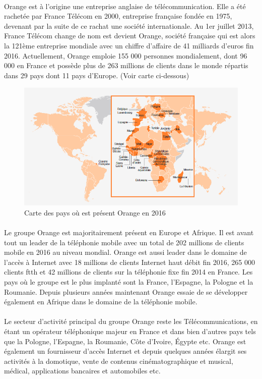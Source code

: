 \documentclass[12pt,a4paper]{report}
\begin{document}
\paragraph*{}
Orange est à l’origine une entreprise anglaise de télécommunication. Elle a été rachetée par France Télécom en 2000, entreprise française fondée en 1975, devenant par la suite de ce rachat une société internationale. Au 1er juillet 2013, France Télécom change de nom est devient Orange, société française qui est alors la 121ème entreprise mondiale avec un chiffre d’affaire de 41 milliards d’euros fin 2016. Actuellement, Orange emploie 155 000 personnes mondialement, dont 96 000 en France et possède plus de 263 millions de clients dans le monde répartis dans 29 pays dont 11 pays d’Europe. (Voir carte ci-dessous)
\begin{figure}[!ht]
    \center
    \includegraphics[scale=0.8]{./img/world_orange_2016.PNG}
    \caption{Carte des pays où est présent Orange en 2016}
\end{figure}
\paragraph*{}
Le groupe Orange est majoritairement présent en Europe et Afrique. Il est avant tout un leader de la téléphonie mobile avec un total de 202 millions de clients mobile en 2016 au niveau mondial. Orange est aussi leader dans le domaine de l’accès à Internet avec 18 millions de clients Internet haut débit fin 2016, 265 000 clients \gls{ftth} et 42 millions de clients sur la téléphonie fixe fin 2014 en France. Les pays où le groupe est le plus implanté sont la France, l’Espagne, la Pologne et la Roumanie. Depuis plusieurs années maintenant Orange essaie de se développer également en Afrique dans le domaine de la téléphonie mobile.
\paragraph*{}
Le secteur d’activité principal du groupe Orange reste les Télécommunications, en étant un opérateur téléphonique majeur en France et dans bien d’autres pays tels que la Pologne, l’Espagne, la Roumanie, Côte d’Ivoire, Égypte etc. Orange est également un fournisseur d’accès Internet et depuis quelques années élargit ses activités à la domotique, vente de contenus cinématographique et musical, médical, applications bancaires et automobiles etc.
\end{document}
